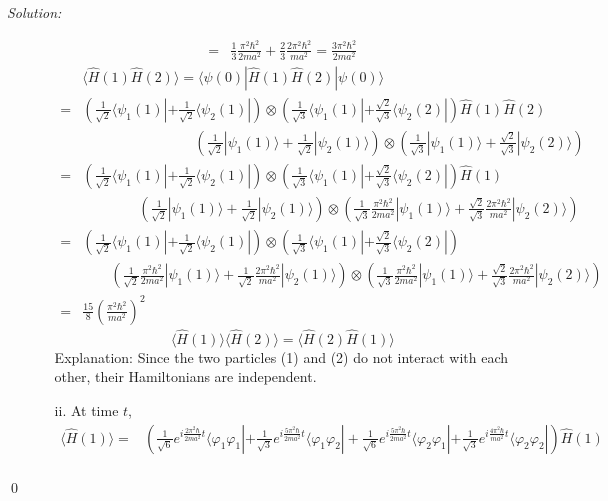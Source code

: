\documentclass[12pt,a4paper]{article}
\newenvironment{sol}
    {\emph{Solution:}
    }
    {
    \qed
    }
\begin{document}
\begin{sol}
\begin{itemize}
\begin{itemize}
\begin{align}
\nonumber=&\frac{1}{3}\frac{\pi^2\hbar^2}{2ma^2}+\frac{2}{3}\frac{2\pi^2\hbar^2}{ma^2}=\frac{3\pi^2\hbar^2}{2ma^2}
\end{align}
\begin{align}
\nonumber&\langle\hat{H}(1)\hat{H}(2)\rangle=\langle\psi(0)|\hat{H}(1)\hat{H}(2)|\psi(0)\rangle\\
\nonumber=&\left(\frac{1}{\sqrt{2}}\langle\psi_1(1)|+\frac{1}{\sqrt{2}}\langle\psi_2(1)|\right)\otimes\left(\frac{1}{\sqrt{3}}\langle\psi_1(1)|+\frac{\sqrt{2}}{\sqrt{3}}\langle\psi_2(2)|\right)\hat{H}(1)\hat{H}(2)\\
\nonumber&\quad\quad\quad\quad\quad\quad\quad\quad\left(\frac{1}{\sqrt{2}}|\psi_1(1)\rangle+\frac{1}{\sqrt{2}}|\psi_2(1)\rangle\right)\otimes\left(\frac{1}{\sqrt{3}}|\psi_1(1)\rangle+\frac{\sqrt{2}}{\sqrt{3}}|\psi_2(2)\rangle\right)\\
\nonumber=&\left(\frac{1}{\sqrt{2}}\langle\psi_1(1)|+\frac{1}{\sqrt{2}}\langle\psi_2(1)|\right)\otimes\left(\frac{1}{\sqrt{3}}\langle\psi_1(1)|+\frac{\sqrt{2}}{\sqrt{3}}\langle\psi_2(2)|\right)\hat{H}(1)\\
\nonumber&\quad\quad\quad\quad\left(\frac{1}{\sqrt{2}}|\psi_1(1)\rangle+\frac{1}{\sqrt{2}}|\psi_2(1)\rangle\right)\otimes\left(\frac{1}{\sqrt{3}}\frac{\pi^2\hbar^2}{2ma^2}|\psi_1(1)\rangle+\frac{\sqrt{2}}{\sqrt{3}}\frac{2\pi^2\hbar^2}{ma^2}|\psi_2(2)\rangle\right)\\
\nonumber=&\left(\frac{1}{\sqrt{2}}\langle\psi_1(1)|+\frac{1}{\sqrt{2}}\langle\psi_2(1)|\right)\otimes\left(\frac{1}{\sqrt{3}}\langle\psi_1(1)|+\frac{\sqrt{2}}{\sqrt{3}}\langle\psi_2(2)|\right)\\
\nonumber&\quad\quad\left(\frac{1}{\sqrt{2}}\frac{\pi^2\hbar^2}{2ma^2}|\psi_1(1)\rangle+\frac{1}{\sqrt{2}}\frac{2\pi^2\hbar^2}{ma^2}|\psi_2(1)\rangle\right)\otimes\left(\frac{1}{\sqrt{3}}\frac{\pi^2\hbar^2}{2ma^2}|\psi_1(1)\rangle+\frac{\sqrt{2}}{\sqrt{3}}\frac{2\pi^2\hbar^2}{ma^2}|\psi_2(2)\rangle\right)\\
=&\frac{15}{8}\left(\frac{\pi^2\hbar^2}{ma^2}\right)^2
\end{align}
\begin{equation}
\langle\hat{H}(1)\rangle\langle\hat{H}(2)\rangle=\langle\hat{H}(2)\hat{H}(1)\rangle
\end{equation}
Explanation: Since the two particles (1) and (2) do not interact with each other, their Hamiltonians are independent.
\item[ii.] At time $t$,
\footnotesize\begin{align}
\nonumber\langle\hat{H}(1)\rangle=&\left(\frac{1}{\sqrt{6}}e^{i\frac{2\pi^2\hbar}{2ma^2}t}\langle\varphi_1\varphi_1|+\frac{1}{\sqrt{3}}e^{i\frac{5\pi^2\hbar}{2ma^2}t}\langle\varphi_1\varphi_2|+\frac{1}{\sqrt{6}}e^{i\frac{5\pi^2\hbar}{2ma^2}t}\langle\varphi_2\varphi_1|+\frac{1}{\sqrt{3}}e^{i\frac{4\pi^2\hbar}{ma^2}t}\langle\varphi_2\varphi_2|\right)\hat{H}(1)\\

\end{align}
\end{itemize}
\end{itemize}
\end{sol}
\end{document}
